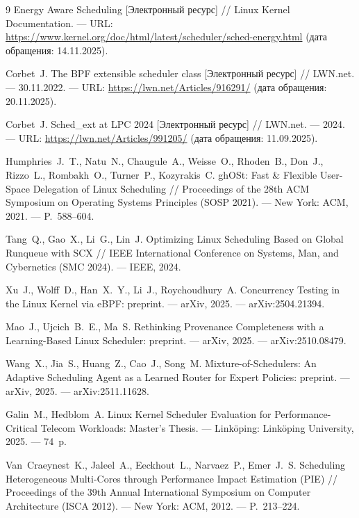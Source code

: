 \documentclass[14pt, oneside]{extbook}
\begin{document}
\begin{thebibliography}{9}
        Energy Aware Scheduling [Электронный ресурс] // Linux Kernel
        Documentation. --- URL:
        \url{https://www.kernel.org/doc/html/latest/scheduler/sched-energy.html}
        (дата обращения: 14.11.2025).

        Corbet~J. The BPF extensible scheduler class [Электронный
        ресурс] // LWN.net. --- 30.11.2022. --- URL:
        \url{https://lwn.net/Articles/916291/}
        (дата обращения: 20.11.2025).

        Corbet~J. Sched\_ext at LPC 2024 [Электронный ресурс] //
        LWN.net. --- 2024. --- URL:
        \url{https://lwn.net/Articles/991205/}
        (дата обращения: 11.09.2025).

        Humphries~J.~T., Natu~N., Chaugule~A., Weisse~O., Rhoden~B.,
        Don~J., Rizzo~L., Rombakh~O., Turner~P., Kozyrakis~C. ghOSt:
        Fast \& Flexible User-Space Delegation of Linux Scheduling //
        Proceedings of the 28th ACM Symposium on Operating Systems
        Principles (SOSP 2021). --- New York: ACM, 2021. ---
        P.~588--604.

        Tang~Q., Gao~X., Li~G., Lin~J. Optimizing Linux Scheduling Based
        on Global Runqueue with SCX // IEEE International Conference on
        Systems, Man, and Cybernetics (SMC 2024). --- IEEE, 2024.

        Xu~J., Wolff~D., Han~X.~Y., Li~J., Roychoudhury~A. Concurrency
        Testing in the Linux Kernel via eBPF: preprint. --- arXiv,
        2025. --- arXiv:2504.21394.

        Mao~J., Ujcich~B.~E., Ma~S. Rethinking Provenance Completeness
        with a Learning-Based Linux Scheduler: preprint. --- arXiv,
        2025. --- arXiv:2510.08479.

        Wang~X., Jia~S., Huang~Z., Cao~J., Song~M. Mixture-of-Schedulers:
        An Adaptive Scheduling Agent as a Learned Router for Expert
        Policies: preprint. --- arXiv, 2025. --- arXiv:2511.11628.

        Galin~M., Hedblom~A. Linux Kernel Scheduler Evaluation for
        Performance-Critical Telecom Workloads: Master's Thesis. ---
        Linköping: Linköping University, 2025. --- 74~p.

        Van~Craeynest~K., Jaleel~A., Eeckhout~L., Narvaez~P.,
        Emer~J.~S. Scheduling Heterogeneous Multi-Cores through
        Performance Impact Estimation (PIE) // Proceedings of the 39th
        Annual International Symposium on Computer Architecture (ISCA
        2012). --- New York: ACM, 2012. --- P.~213--224.


\end{thebibliography}
\end{document}
